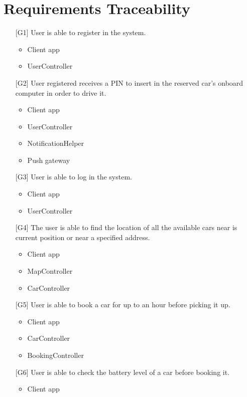 \chapter{Requirements Traceability}

\begin{itemize}
	\item[{[G1]}] User is able to register in the system.
		\begin{itemize}
			\item Client app
			\item UserController
		\end{itemize}
	\item[{[G2]}] User registered receives a PIN to insert in the reserved car's onboard computer in order to drive it.
		\begin{itemize}
			\item Client app
			\item UserController
			\item NotificationHelper
			\item Push gateway
		\end{itemize}
	\item[{[G3]}] User is able to log in the system.
		\begin{itemize}
			\item Client app
			\item UserController
		\end{itemize}
	\item[{[G4]}] The user is able to find the location of all the available cars near is current position or near a specified address.
		\begin{itemize}
			\item Client app
			\item MapController
			\item CarController
		\end{itemize}
	\item[{[G5]}] User is able to book a car for up to an hour before picking it up.
		\begin{itemize}
			\item Client app
			\item CarController
			\item BookingController
		\end{itemize}
	\item[{[G6]}] User is able to check the battery level of a car before booking it.
		\begin{itemize}
			\item Client app

\end{itemize}
\end{itemize}
